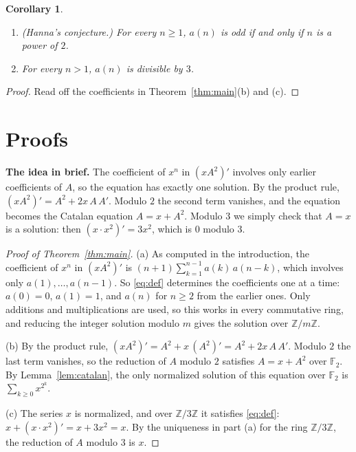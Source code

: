 \documentclass[11pt,a4paper]{article}
\newtheorem{corollary}[theorem]{Corollary}
\theoremstyle{definition}
\theoremstyle{remark}
\newcommand{\Z}{\mathbb{Z}}
\newcommand{\F}{\mathbb{F}}
\newcommand{\para}[1]{\par\medskip\noindent\textbf{#1}\enspace}
\begin{document}
\begin{corollary}\label{cor:conj}
\begin{enumerate}[label=(\roman*)]
\item (Hanna's conjecture.) For every $n\ge1$, $a(n)$ is odd if and only if $n$ is a power of $2$.
\item For every $n>1$, $a(n)$ is divisible by $3$.
\end{enumerate}
\end{corollary}

\begin{proof}
Read off the coefficients in Theorem~\ref{thm:main}(b) and (c).
\end{proof}

\section{Proofs}\label{sec:proofs}

\para{The idea in brief.} The coefficient of $x^n$ in $(xA^2)'$ involves only earlier coefficients of $A$, so the
equation has exactly one solution. By the product rule, $(xA^2)'=A^2+2x\,A\,A'$. Modulo $2$ the second term vanishes, and
the equation becomes the Catalan equation $A=x+A^2$. Modulo $3$ we simply check that $A=x$ is a solution: then
$(x\cdot x^2)'=3x^2$, which is $0$ modulo $3$.

\begin{proof}[Proof of Theorem~\ref{thm:main}]
(a) As computed in the introduction, the coefficient of $x^n$ in $(xA^2)'$ is $(n+1)\sum_{k=1}^{n-1}a(k)\,a(n-k)$, which
involves only $a(1),\dots,a(n-1)$. So \eqref{eq:def} determines the coefficients one at a time: $a(0)=0$, $a(1)=1$, and
$a(n)$ for $n\ge2$ from the earlier ones. Only additions and multiplications are used, so this works in every commutative
ring, and reducing the integer solution modulo $m$ gives the solution over $\Z/m\Z$.

(b) By the product rule, $(xA^2)'=A^2+x\,(A^2)'=A^2+2x\,A\,A'$. Modulo $2$ the last term vanishes, so the reduction of
$A$ modulo $2$ satisfies $A=x+A^2$ over $\F_2$. By Lemma~\ref{lem:catalan}, the only normalized solution of this
equation over $\F_2$ is $\sum_{k\ge0}x^{2^k}$.

(c) The series $x$ is normalized, and over $\Z/3\Z$ it satisfies \eqref{eq:def}: $x+(x\cdot x^2)'=x+3x^2=x$. By the
uniqueness in part (a) for the ring $\Z/3\Z$, the reduction of $A$ modulo $3$ is $x$.
\end{proof}
\end{document}
